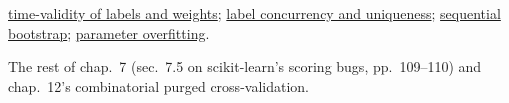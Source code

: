 \begin{qfmethod}
 \hyperref[pit:label-weight-leakage]{time-validity of labels and weights}; \hyperref[def:label-concurrency-uniqueness]{label concurrency and uniqueness}; \hyperref[meth:sequential-bootstrap]{sequential bootstrap}; \hyperref[pit:parameter-overfitting]{parameter overfitting}.

 The rest of chap.~7 (sec.~7.5 on scikit-learn's scoring bugs, pp.~109--110) and chap.~12's combinatorial purged cross-validation.

\end{qfmethod}
